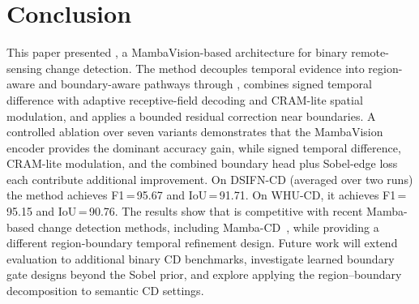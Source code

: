 \section{Conclusion}

This paper presented \ours, a MambaVision-based architecture for binary remote-sensing change detection. The method decouples temporal evidence into region-aware and boundary-aware pathways through \drbi, combines signed temporal difference with adaptive receptive-field decoding and CRAM-lite spatial modulation, and applies a bounded residual correction near boundaries. A controlled ablation over seven variants demonstrates that the MambaVision encoder provides the dominant accuracy gain, while signed temporal difference, CRAM-lite modulation, and the combined boundary head plus Sobel-edge loss each contribute additional improvement. On DSIFN-CD (averaged over two runs) the method achieves F1\,=\,95.67 and IoU\,=\,91.71. On WHU-CD, it achieves F1\,=\,95.15 and IoU\,=\,90.76. The results show that \ours{} is competitive with recent Mamba-based change detection methods, including Mamba-CD~\cite{peng2026mambacd}, while providing a different region-boundary temporal refinement design. Future work will extend evaluation to additional binary CD benchmarks, investigate learned boundary gate designs beyond the Sobel prior, and explore applying the region--boundary decomposition to semantic CD settings.
